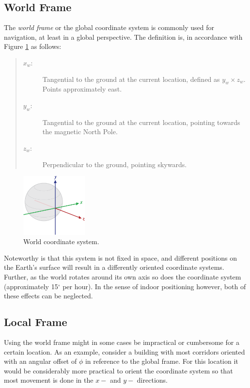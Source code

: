 \documentclass{LTHthesis}
\begin{document}
\subsection{World Frame}
%
The \emph{world frame} or the global coordinate system is commonly used for navigation, at least in a global perspective. The definition is, in accordance with Figure \ref{axis_globe} as follows:
%
\begin{quote}
\begin{description}
\item[$x_w$:] Tangential to the ground at the current location, defined as $y_w\times z_w$. Points approximately east. 
\item[$y_w$:] Tangential to the ground at the current location, pointing towards the magnetic North Pole.
\item[$z_w$:] Perpendicular to the ground, pointing skywards.
\end{description}
\end{quote}
%
\begin{figure}[!hbt]
\begin{center}

\includegraphics[width=0.3\textwidth ]{images/background_on_navigation/axis_globe.png}
\end{center}
\caption[]{World coordinate system.\footnotemark}\label{axis_globe}
\end{figure}
%
%
Noteworthy is that this system is not fixed in space, and different positions on the Earth's surface will result in a differently oriented coordinate systems. Further, as the world rotates around its own axis so does the coordinate system (approximately 15$^\circ$ per hour). In the sense of indoor positioning however, both of these effects can be neglected.
%
\subsection{Local Frame}
%
Using the world frame might in some cases be impractical or cumbersome for a certain location. As an example, consider a  building with most corridors oriented with an angular offset of $\phi$ in reference to the global frame. For this location it would be considerably more practical to orient the coordinate system so that most movement is done in the $x-$ and $y-$ directions.   
\end{document}
